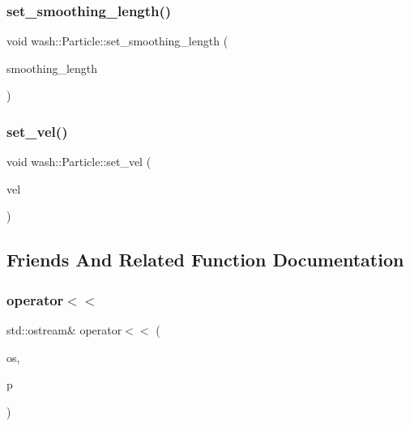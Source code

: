 \mbox{\label{classwash_1_1Particle_a15892a4346c05de955f91087dc88786d}} 
\subsubsection{\texorpdfstring{set\+\_\+smoothing\+\_\+length()}{set\_smoothing\_length()}}
{\footnotesize\ttfamily void wash\+::\+Particle\+::set\+\_\+smoothing\+\_\+length (\begin{DoxyParamCaption}\item[{const double}]{smoothing\+\_\+length }\end{DoxyParamCaption})}

\mbox{\label{classwash_1_1Particle_a4755365883cfd62117ebe74fe44d35e0}} 
\subsubsection{\texorpdfstring{set\+\_\+vel()}{set\_vel()}}
{\footnotesize\ttfamily void wash\+::\+Particle\+::set\+\_\+vel (\begin{DoxyParamCaption}\item[{const \mbox{\hyperlink{namespacewash_ab2cbbc37941b733095c9225b49b4cad9}{Simulation\+VecT}}}]{vel }\end{DoxyParamCaption})}



\subsection{Friends And Related Function Documentation}
\mbox{\label{classwash_1_1Particle_ad7d60c63b6d14d1d0d4fe42d4e9dc8bc}} 
\subsubsection{\texorpdfstring{operator$<$$<$}{operator<<}}
{\footnotesize\ttfamily std\+::ostream\& operator$<$$<$ (\begin{DoxyParamCaption}\item[{std\+::ostream \&}]{os,  }\item[{const \mbox{\hyperlink{classwash_1_1Particle}{Particle}} \&}]{p }\end{DoxyParamCaption})\hspace{0.3cm}{\ttfamily [friend]}}



